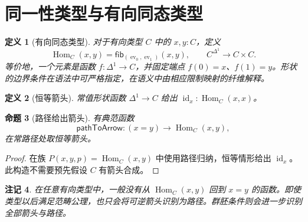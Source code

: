 \documentclass[12pt,oneside,openany,fontset=none]{ctexbook}
\theoremstyle{cn}
\newtheorem{definition}{定义}[chapter]
\newtheorem{proposition}[definition]{命题}
\newtheorem{remark}[definition]{注记}
\numberwithin{equation}{chapter}
\newcommand{\id}{\operatorname{id}}
\newcommand{\Hom}{\operatorname{Hom}}
\newcommand{\fib}{\mathsf{fib}}
\newcommand{\ev}{\operatorname{ev}}
\begin{document}
\section{同一性类型与有向同态类型}
\begin{definition}[有向同态类型]
对于有向类型 $C$ 中的 $x,y:C$，定义
\[
\Hom_C(x,y)=
\fib_{(\ev_0,\ev_1)}(x,y),
\qquad
C^{\Delta^1}\to C\times C.
\]
等价地，一个元素是函数 $f:\Delta^1\to C$，并固定端点 $f(0)=x$、$f(1)=y$。形状的边界条件在语法中可严格指定，在语义中由相应限制映射的纤维解释。
\end{definition}
\begin{definition}[恒等箭头]
常值形状函数 $\Delta^1\to C$ 给出 $\id_x:\Hom_C(x,x)$。
\end{definition}
\begin{proposition}[路径给出箭头]
有典范函数
\[
\mathsf{pathToArrow}:(x=y)\to\Hom_C(x,y),
\]
在常路径处取恒等箭头。
\end{proposition}
\begin{proof}
在族 $P(x,y,p)=\Hom_C(x,y)$ 中使用路径归纳，恒等情形给出 $\id_x$。此构造不需要预先假设 $C$ 有箭头合成。
\end{proof}
\begin{remark}
在任意有向类型中，一般没有从 $\Hom_C(x,y)$ 回到 $x=y$ 的函数。即使类型以后满足范畴公理，也只会将可逆箭头识别为路径。群胚条件则会进一步识别全部箭头与路径。
\end{remark}
\end{document}
